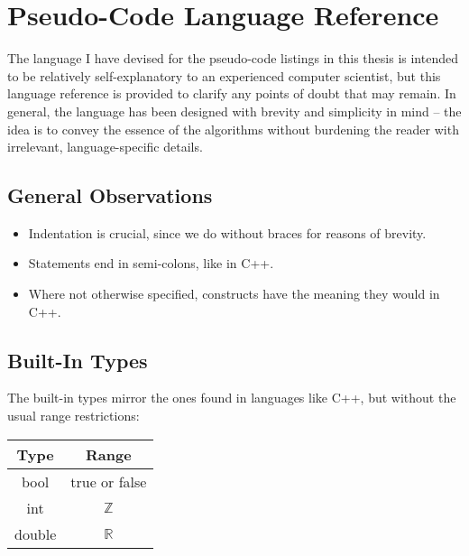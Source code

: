 \chapter{Pseudo-Code Language Reference}
\label{chap:appendixlang}

\enlargethispage*{\baselineskip}

The language I have devised for the pseudo-code listings in this thesis is intended to be relatively self-explanatory to an experienced computer scientist, but this language reference is provided to clarify any points of doubt that may remain. In general, the language has been designed with brevity and simplicity in mind -- the idea is to convey the essence of the algorithms without burdening the reader with irrelevant, language-specific details.

\section{General Observations}

\begin{itemize}
\item Indentation is crucial, since we do without braces for reasons of brevity.
\item Statements end in semi-colons, like in C++.
\item Where not otherwise specified, constructs have the meaning they would in C++.
\end{itemize}

\section{Built-In Types}

The built-in types mirror the ones found in languages like C++, but without the usual range restrictions:

\begin{center}
\begin{tabular}{c|c}
\textbf{Type} & \textbf{Range} \\
\hline
bool & true or false \\
int & $\mathbb{Z}$ \\
double & $\mathbb{R}$
\end{tabular}
\end{center}

